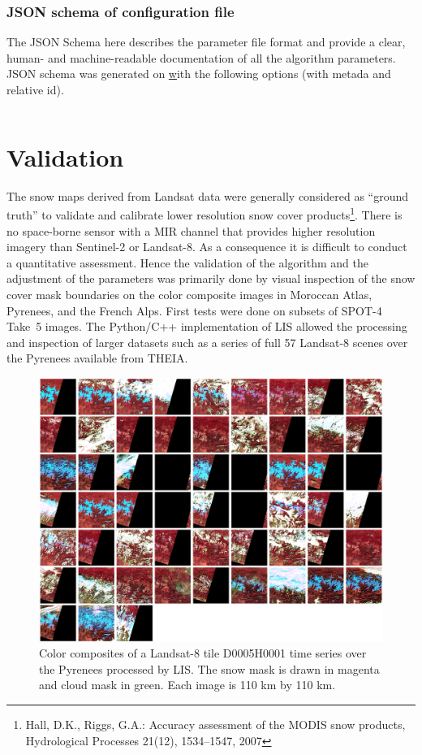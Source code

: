 \documentclass[a4paper]{article}
\begin{document}
\subsubsection{JSON schema of configuration file}\label{par:jsonparam}

The JSON Schema here describes the parameter file format and provide a clear, human-
and machine-readable documentation of all the algorithm parameters. JSON schema
was generated on \href{https://jsonschema.net} with the following options (with
metada and relative id).

\inputminted[tabsize=2, fontsize=\tiny]{js}{schema.json}

\section{Validation}\label{par:validation}

The snow maps derived from Landsat data were generally considered as ``ground truth'' to validate and calibrate lower resolution snow cover products\footnote{Hall, D.K., Riggs, G.A.: Accuracy assessment of the MODIS snow products, Hydrological Processes 21(12), 1534–1547, 2007}. There is no space-borne sensor with a MIR channel that provides higher resolution imagery than Sentinel-2 or Landsat-8. As a consequence it is difficult to conduct a quantitative assessment. Hence the validation of the algorithm and the adjustment of the parameters was primarily done by visual inspection of the snow cover mask boundaries on the color composite images in Moroccan Atlas, Pyrenees, and the French Alps. First tests were done on subsets of SPOT-4 Take~5 images. The Python/C++ implementation of LIS allowed the processing and inspection of larger datasets such as a series of full 57 Landsat-8 scenes over the Pyrenees available from THEIA.

\begin{figure}[h]
 \centering
 \includegraphics[width=\textwidth]{./images/montage_L8CESneige.png}
 \caption{Color composites of a Landsat-8 tile D0005H0001 time series over the Pyrenees processed by LIS. The snow mask is drawn in magenta and cloud mask in green. Each image is 110 km by 110 km.}
 \label{fig:L8montage}
\end{figure}
\end{document}
